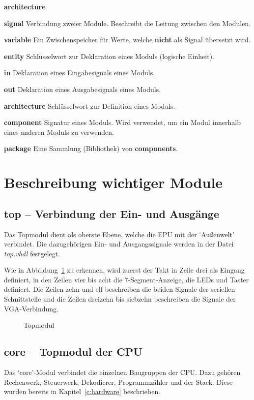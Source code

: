 \begin{labeling}{\textbf{architecture}}
\item[\textbf{signal}] Verbindung zweier Module. Beschreibt die Leitung zwischen
	den Modulen.
\item[\textbf{variable}] Ein Zwischenspeicher für Werte, welche \textbf{nicht}
	als Signal übersetzt wird.
\item[\textbf{entity}] Schlüsselwort zur Deklaration eines Moduls (logische Einheit).
\item[\textbf{in}] Deklaration eines Eingabesignals eines Moduls.
\item[\textbf{out}]	Deklaration eines Ausgabesignals eines Moduls.
\item[\textbf{architecture}] Schlüsselwort zur Definition eines Moduls.
\item[\textbf{component}] Signatur eines Moduls. Wird verwendet, um ein Modul
	innerhalb eines anderen Moduls zu verwenden.
\item[\textbf{package}]	Eine Sammlung (Bibliothek) von \textbf{components}.
\end{labeling}
\pagebreak
\section{Beschreibung wichtiger Module}
\subsection{top -- Verbindung der Ein- und Ausgänge}
\label{s:top}
Das Topmodul dient als oberste Ebene, welche die \ac{EPU} mit der `Außenwelt'
verbindet. Die dazugehörigen Ein- und Ausgangssignale werden in der Datei
\textit{top.vhdl} festgelegt.

Wie in Abbildung~\ref{code:top} zu erkennen, wird zuerst der Takt in Zeile drei
als Eingang definiert, in den Zeilen vier bis acht die 7-Segment-Anzeige, die
LEDs und Taster definiert. Die Zeilen zehn und elf beschreiben die beiden
Signale der seriellen Schnittstelle und die Zeilen dreizehn bis siebzehn
beschreiben die Signale der VGA-Verbindung.
\begin{figure}[htb]

\caption{Topmodul}
\label{code:top}
\end{figure}
\pagebreak
\subsection{core -- Topmodul der CPU}
\label{s:core}
Das `core'-Modul verbindet die einzelnen Baugruppen der CPU\@. Dazu gehören
Rechenwerk, Steuerwerk, Dekodierer, Programmzähler und der Stack. Diese wurden
bereits in Kapitel~\ref{c:hardware} beschrieben.

